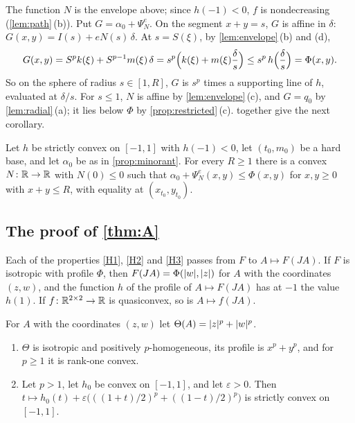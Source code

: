 The function $N$ is the envelope above; since $h(-1)<0$, $f$ is nondecreasing
(\cref{lem:path}\,(b)). Put $G=\alpha_0+\Psi^e_N$. On the segment $x+y=s$, $G$ is affine in
$\delta$: $G(x,y)=I(s)+eN(s)\,\delta$. At $s=S(\xi)$, by \cref{lem:envelope}\,(b) and (d),
\[
  G(x,y)=S^pk(\xi)+S^{p-1}m(\xi)\,\delta=s^p\Bigl(k(\xi)+m(\xi)\frac\delta s\Bigr)
  \le s^p\,h\Bigl(\frac\delta s\Bigr)=\Phi(x,y).
\]
So on the sphere of radius $s\in[1,R]$, $G$ is $s^p$ times a supporting line of $h$, evaluated
at $\delta/s$. For $s\le1$, $N$ is affine by \cref{lem:envelope}\,(c), and $G=q_0$ by
\cref{lem:radial}\,(a); it lies below $\Phi$ by \cref{prop:restricted}\,(c).
 together give the next corollary.

\begin{corollary}\label{cor:minorant}
Let $h$ be strictly convex on $[-1,1]$ with $h(-1)<0$, let $(t_0,m_0)$ be a hard base, and let
$\alpha_0$ be as in \cref{prop:minorant}. For every $R\ge1$ there is a convex
$N\colon\mathbb{R}\to\mathbb{R}$ with $N(0)\le0$ such that $\alpha_0+\Psi^e_N(x,y)\le\Phi(x,y)$ for
$x,y\ge0$ with $x+y\le R$, with equality at $(x_{t_0},y_{t_0})$.
\end{corollary}

\subsection{The proof of \texorpdfstring{\cref{thm:A}}{Theorem A}}\label{sec:proofA}

\begin{lemma}\label{lem:reflect}
Each of the properties \ref{H1}, \ref{H2} and \ref{H3} passes from $F$ to $A\mapsto F(JA)$. If
$F$ is isotropic with profile $\Phi$, then $F(JA)=\Phi(\lvert w\rvert,\lvert z\rvert)$ for $A$ with the
coordinates $(z,w)$, and the function $h$ of the profile of $A\mapsto F(JA)$ has at $-1$ the
value $h(1)$. If $f\colon\mathbb{R}^{2\times 2}\to\mathbb{R}$ is quasiconvex, so is $A\mapsto f(JA)$.
\end{lemma}

\begin{lemma}\label{lem:perturb}
For $A$ with the coordinates $(z,w)$ let $\Theta(A)=\lvert z\rvert^p+\lvert w\rvert^p$.
\begin{enumerate}[label=\textup{(\alph*)}]
\item $\Theta$ is isotropic and positively $p$-homogeneous, its profile is $x^p+y^p$, and for
  $p\ge1$ it is rank-one convex.
\item Let $p>1$, let $h_0$ be convex on $[-1,1]$, and let $\varepsilon>0$. Then
  $t\mapsto h_0(t)+\varepsilon\bigl(((1+t)/2)^p+((1-t)/2)^p\bigr)$ is strictly convex on
  $[-1,1]$.
\end{enumerate}
\end{lemma}

